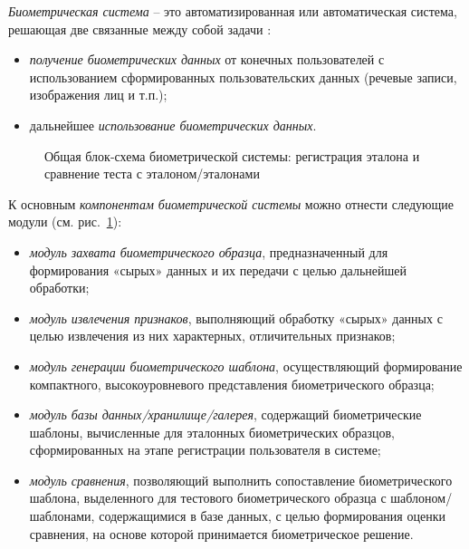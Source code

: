 \documentclass[12pt]{book}
\begin{document}
\large{\textit{Биометрическая система} -- это автоматизированная или автоматическая система, решающая две связанные между собой задачи \cite{kukharev_2013}: 

\begin{itemize}[topsep=1pt] \itemsep0.1em
\item \textit{получение биометрических данных} от конечных пользователей с использованием сформированных пользовательских данных (речевые записи, изображения лиц и т.п.);
\item дальнейшее \textit{использование биометрических данных}.
\end{itemize}

\begin{figure}[h]
\caption{Общая блок-схема биометрической системы: регистрация эталона и сравнение теста с эталоном/эталонами}
\label{fig:figure_1_1}
\end{figure}

К основным \textit{компонентам биометрической системы} можно отнести следующие модули (см. рис.~\ref{fig:figure_1_1}): 

\begin{itemize}[topsep=1pt] \itemsep0.1em
\item \textit{модуль захвата биометрического образца}, предназначенный для формирования «сырых» данных и их передачи с целью дальнейшей обработки;
\item \textit{модуль извлечения признаков}, выполняющий обработку «сырых» данных с целью извлечения из них характерных, отличительных признаков;
\item \textit{модуль генерации биометрического шаблона}, осуществляющий формирование компактного, высокоуровневого представления биометрического образца;
\item \textit{модуль базы данных/хранилище/галерея}, содержащий биометрические шаблоны, вычисленные для эталонных биометрических образцов, сформированных на этапе регистрации пользователя в системе;
\item \textit{модуль сравнения}, позволяющий выполнить сопоставление биометрического шаблона, выделенного для тестового биометрического образца с шаблоном/шаблонами, содержащимися в базе данных, с целью формирования оценки сравнения, на основе которой принимается биометрическое решение.
\end{itemize}

}
\end{document}
